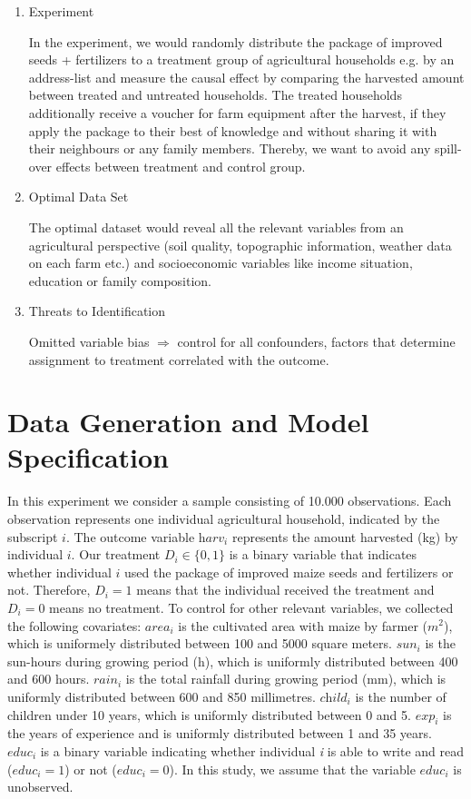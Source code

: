 \begin{enumerate}
\item Experiment

In the experiment, we would randomly distribute the package of improved seeds + fertilizers to a treatment group of agricultural households e.g. by an address-list and measure the causal effect by comparing the harvested amount between treated and untreated households. The treated households additionally receive a voucher for farm equipment after the harvest, if they apply the package to their best of knowledge and without sharing it with their neighbours or any family members. Thereby, we want to avoid any spill-over effects between treatment and control group.

\item Optimal Data Set

The optimal dataset would reveal all the relevant variables from an agricultural perspective (soil quality, topographic information, weather data on each farm etc.) and socioeconomic variables like income situation, education or family composition.

\item Threats to Identification

Omitted variable bias $\Rightarrow$ control for all confounders, factors that determine assignment to treatment correlated with the outcome. 

\end{enumerate}

\section{Data Generation and Model Specification} \label{sec:data}

In this experiment we consider a sample consisting of 10.000 observations. Each observation represents one individual agricultural household, indicated by the subscript $\textit{i}$. The outcome variable $\textit{harv}_i$ represents the amount harvested (kg) by individual $\textit{i}$. Our treatment $\textit{D}_i \in \{0,1\}$ is a binary variable that indicates whether individual $\textit{i}$ used the package of improved maize seeds and fertilizers or not. Therefore, $\textit{D}_i = 1$ means that the individual received the treatment and $\textit{D}_i = 0$ means no treatment. To control for other relevant variables, we collected the following covariates: $\textit{area}_i$ is the cultivated area with maize by farmer ($m^2$), which is uniformely distributed between 100 and 5000 square meters. $\textit{sun}_i$ is the sun-hours during growing period (h), which is uniformly distributed between 400 and 600 hours. $\textit{rain}_i$ is the total rainfall during growing period (mm), which is uniformly distributed between 600 and 850 millimetres. $\textit{child}_i$ is the number of children under 10 years, which is uniformly distributed between 0 and 5. $\textit{exp}_i$ is the years of experience and is uniformly distributed between 1 and 35 years. $\textit{educ}_i$ is a binary variable indicating whether individual \textit{i} is able to write and read ($\textit{educ}_i = 1$) or not ($\textit{educ}_i = 0$). In this study, we assume that the variable $\textit{educ}_i$ is unobserved.

